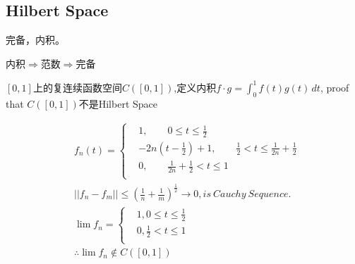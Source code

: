 \documentclass[UTF8]{../../09-Mathematics}
\begin{document}
\subsection{Hilbert Space}

完备，内积。

内积$\Rightarrow$范数$\Rightarrow$完备


\begin{proposition}
  $[0,1]$上的复连续函数空间$ C([0, 1])$,定义内积$f \cdot g = \int_{0}^{1} f(t)g(t) \,dt $, proof that $ C([0, 1])$不是Hilbert Space

  \begin{equation}
    \begin{aligned}
    &f_n(t) =
    \begin{cases}
    &1,\qquad 0 \leqslant t \leqslant \frac{1}{2}\\
    &-2n(t- \frac{1}{2}) + 1,\qquad \frac{1}{2} < t \leqslant \frac{1}{2n} + \frac{1}{2}\\
    &0, \qquad \frac{1}{2n} + \frac{1}{2} < t \leqslant 1\\
    \end{cases}\\
    &|| f_n - f_m|| \leqslant (\frac{1}{n} + \frac{1}{m})^{\frac{1}{2}} \rightarrow 0, is \  Cauchy \  Sequence.\\
    & \lim f_n = 
    \begin{cases}
      &1,  0 \leqslant t \leqslant \frac{1}{2}\\
      &0,  \frac{1}{2} < t \leqslant 1\\
    \end{cases}\\
    & \therefore \lim f_n \notin C([0, 1])
    \end{aligned}
  \end{equation}

\end{proposition}
\end{document}
